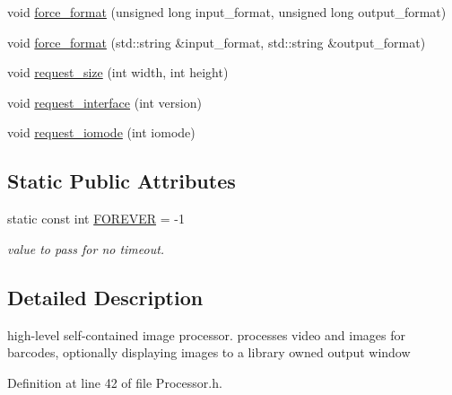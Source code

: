 \begin{DoxyCompactItemize}
\item 
void \hyperlink{classzbar_1_1_processor_a4e70fa0776325e8d6cfb683f0b3e6dde}{force\_\-format} (unsigned long input\_\-format, unsigned long output\_\-format)
\item 
void \hyperlink{classzbar_1_1_processor_a1bd272fc138f47a35c495cfc38dc268a}{force\_\-format} (std::string \&input\_\-format, std::string \&output\_\-format)
\item 
void \hyperlink{classzbar_1_1_processor_a3bb85b22a5eaf326e73074c9dfca5db7}{request\_\-size} (int width, int height)
\item 
void \hyperlink{classzbar_1_1_processor_ad666a8fdcb0d36ca22170a03027c2463}{request\_\-interface} (int version)
\item 
void \hyperlink{classzbar_1_1_processor_a3a58240631be83343fc081dd3a31a7c0}{request\_\-iomode} (int iomode)
\end{DoxyCompactItemize}
\subsection*{Static Public Attributes}
\begin{DoxyCompactItemize}
\item 
\hypertarget{classzbar_1_1_processor_a9d96e94544935aec0f8f975b0ea15a9f}{
static const int \hyperlink{classzbar_1_1_processor_a9d96e94544935aec0f8f975b0ea15a9f}{FOREVER} = -\/1}
\label{classzbar_1_1_processor_a9d96e94544935aec0f8f975b0ea15a9f}

\begin{DoxyCompactList}\small\item\em value to pass for no timeout. \end{DoxyCompactList}\end{DoxyCompactItemize}


\subsection{Detailed Description}
high-\/level self-\/contained image processor. processes video and images for barcodes, optionally displaying images to a library owned output window 

Definition at line 42 of file Processor.h.



